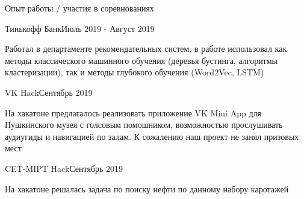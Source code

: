 \documentclass{resume} %
\begin{document}
\begin{rSection}{Опыт работы / участия в соревнованиях}

\begin{rSubsection}{Тинькофф Банк}{Июль 2019 - Август 2019}{}{}
\item Работал в департаменте рекомендательных систем, в работе использовал как методы классического машинного обучения (деревья бустинга, алгоритмы кластеризации),  так и методы глубокого обучения (Word2Vec, LSTM)
\end{rSubsection}

\begin{rSubsection}{VK Hack}{Сентябрь 2019}{}{}
\item На хакатоне предлагалось реализовать приложение VK Mini App для Пушкинского музея с голсовым помошником, возможностью прослушивать аудиугиды и навигацией по залам. К сожалению наш проект не занял призовых мест 
\end{rSubsection}

\begin{rSubsection}{CET-MIPT Hack}{Сентябрь 2019}{}{}
\item На хакатоне решалась задача по поиску нефти по данному набору каротажей
\end{rSubsection}

\end{rSection}
\end{document}

